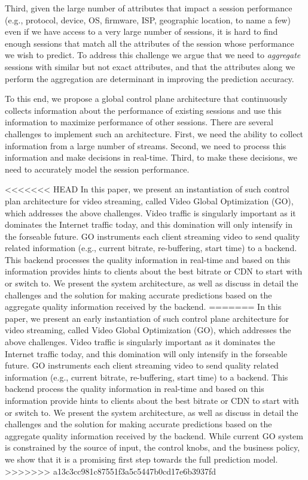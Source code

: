 Third, given the large number of attributes that impact a session performance (e.g., protocol, device, OS, firmware, ISP, geographic location, to name a few) even if we have access to a very large number of sessions, it is hard to find enough sessions that match all the attributes of the session whose performance we wish to predict. To address this challenge we argue that we need to \emph{aggregate} sessions with similar but not exact attributes, and that the attributes along we perform the aggregation are determinant in improving the prediction accuracy.

To this end, we propose a global control plane architecture that continuously collects information about the performance of existing sessions and use this information to maximize performance of other sessions. There are several challenges to implement such an architecture. First, we need the ability to collect information from a large number of streams. Second, we need to process this information and make decisions in real-time. Third, to make these decisions, we need to accurately model the session performance. 

<<<<<<< HEAD
In this paper, we present an instantiation of such control plan architecture for video streaming, called Video Global Optimization (GO), which addresses the above challenges.  Video traffic is singularly important as it dominates the Internet traffic today, and this domination will only intensify in the forseable future. GO instruments each client streaming video to send quality related information (e.g., current bitrate, re-buffering, start time) to a backend. This backend processes the quality information in real-time and based on this information provides hints to clients about the best bitrate or CDN to start with or switch to. We present the system architecture, as well as discuss in detail the challenges and the solution for making accurate predictions based on the aggregate quality information received by the backend. 
=======
In this paper, we present an early instantiation of such control plane architecture for video streaming, called Video Global Optimization (GO), which addresses the above challenges.  Video traffic is singularly important as it dominates the Internet traffic today, and this domination will only intensify in the forseable future. GO instruments each client streaming video to send quality related information (e.g., current bitrate, re-buffering, start time) to a backend. This backend process the quality information in real-time and based on this information provide hints to clients about the best bitrate or CDN to start with or switch to. We present the system architecture, as well as discuss in detail the challenges and the solution for making accurate predictions based on the aggregate quality information received by the backend. While current GO system is constrained by the source of input, the control knobs, and the business policy, we show that it is a promising first step towards the full prediction model. 
>>>>>>> a13c3cc981c87551f3a5c5447b0cd17e6b3937fd
   
